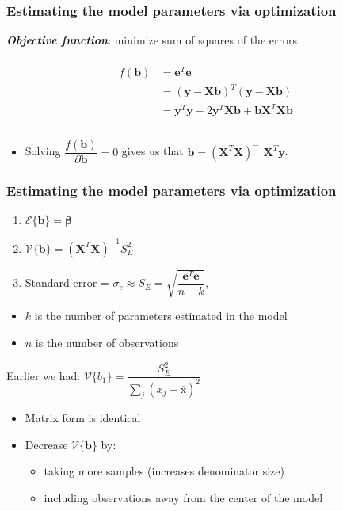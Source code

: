 \begin{frame}\frametitle{Estimating the model parameters via optimization}

	\textbf{\emph{Objective function}}: minimize sum of squares of the errors

	$$
	\begin{array}{rl}
		& \\
		f(\mathbf{b}) &= \mathbf{e}^T\mathbf{e} \\
		&= \left(\mathbf{y} - \mathbf{X} \mathbf{b} \right)^T \left( \mathbf{y} - \mathbf{X} \mathbf{b} \right) \\
		&= \mathbf{y}^T\mathbf{y} - 2 \mathbf{y}^T\mathbf{X}\mathbf{b} + \mathbf{b}\mathbf{X}^T\mathbf{X}\mathbf{b} \\
		\\
	\end{array}
	$$
	\begin{itemize}
		\item	Solving $\dfrac{f(\mathbf{b})}{
		\partial{\mathbf{b}}} = 0 $ gives us that $\mathbf{b} = \left( \mathbf{X}^T\mathbf{X} \right)^{-1}\mathbf{X}^T\mathbf{y}$.
	\end{itemize}
\end{frame}

\begin{frame}\frametitle{Estimating the model parameters via optimization}
	\begin{enumerate}
		\item	$\mathcal{E}\{\mathbf{b}\} = \mathbf{\beta}$
		\item	$\mathcal{V}\{\mathbf{b}\} = \left( \mathbf{X}^T\mathbf{X} \right)^{-1} S_E^2$
		\item	Standard error = $\sigma_e \approx S_E = \sqrt{\dfrac{\mathbf{e}^T\mathbf{e}}{n-k}}$,
	\end{enumerate}
	\begin{itemize}
		\item	$k$ is the number of parameters estimated in the model
		\item	$n$ is the number of observations
	\end{itemize}

	Earlier we had: $\mathcal{V}\{b_1\} = \dfrac{S_E^2}{\sum_j{\left( x_j - \overline{\mathrm{x}} \right)^2}}$
	\begin{itemize}
		\item	Matrix form is identical
		\item	Decrease $\mathcal{V}\{\mathbf{b}\}$ by:
		\begin{itemize}
			\item	taking more samples (increases denominator size)
			\item	including observations away from the center of the model
		\end{itemize}
	\end{itemize}
\end{frame}

